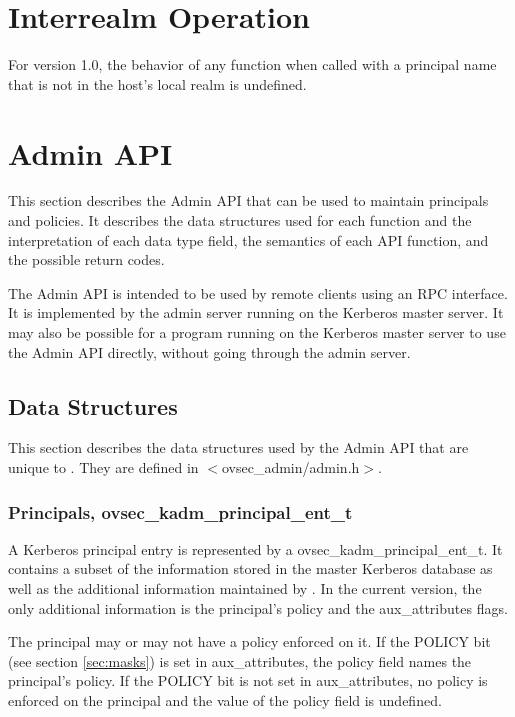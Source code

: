 \section{Interrealm Operation}

For version 1.0, the behavior of any function when called with a
principal name that is not in the host's local realm is undefined.

\section{Admin API}

This section describes the Admin API that can be used to maintain
principals and policies.  It describes the data structures used for
each function and the interpretation of each data type field, the
semantics of each API function, and the possible return codes.

The Admin API is intended to be used by remote clients using an RPC
interface.  It is implemented by the admin server running on the
Kerberos master server.  It may also be possible for a program running
on the Kerberos master server to use the Admin API directly, without
going through the admin server.

\subsection{Data Structures}

This section describes the data structures used by the Admin API that
are unique to \secure{}.  They are defined in $<$ovsec_admin/admin.h$>$.

\subsubsection{Principals, ovsec_kadm_principal_ent_t}
\label{sec:principal-structure}

A Kerberos principal entry is represented by a
ovsec_kadm_principal_ent_t.  It contains a subset of the information
stored in the master Kerberos database as well as the additional
information maintained by \secure{}.  In the current version, the only
additional information is the principal's policy and the
aux_attributes flags.

The principal may or may not have a policy enforced on it.  If the
POLICY bit (see section \ref{sec:masks}) is set in aux_attributes, the
policy field names the principal's policy.  If the POLICY bit is not
set in aux_attributes, no policy is enforced on the principal and the
value of the policy field is undefined.

